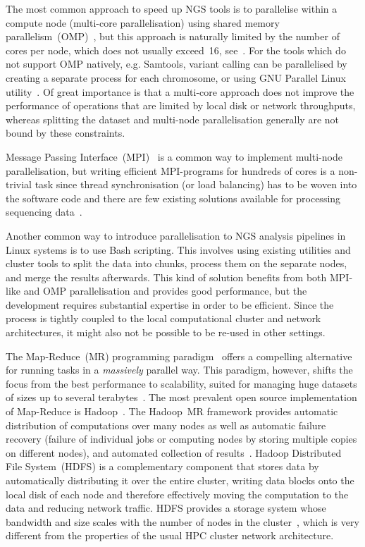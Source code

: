 \documentclass[10pt]{article}
\begin{document}
The most common approach to speed up NGS tools is to parallelise within a compute node (multi-core parallelisation) using shared memory parallelism~(OMP)~\cite{openmp}, but this approach is naturally limited by the number of cores per node, which does not usually exceed~16, see~\cite{top500}. For the tools which do not support OMP natively, e.g. Samtools, variant calling can be parallelised by creating a separate process  for  each chromosome, or using GNU Parallel Linux utility~\cite{Tange2011a}.
Of great importance is that a multi-core approach does not improve the performance of operations that are limited by local disk or network throughputs, whereas splitting the dataset and multi-node parallelisation generally are not bound by these constraints.

Message Passing Interface~(MPI)~\cite{mpi1} is a common way to implement multi-node parallelisation, but writing efficient MPI-programs for hundreds of cores is a non-trivial task since thread synchronisation (or load balancing) has to be woven into the software code and there are few existing solutions available for processing sequencing data~\cite{pmap, erne, gnumap}.

Another common way to introduce parallelisation to NGS analysis pipelines in Linux systems is to use Bash scripting. This involves using existing utilities and cluster tools to split the data into chunks, process them on the separate nodes, and merge the results afterwards. This kind of solution benefits from both MPI-like and OMP parallelisation and provides good performance, but the development requires substantial expertise in order to be efficient. Since the process is tightly coupled to the local computational cluster and network architectures, it might also not be possible to be re-used in other settings.

The Map-Reduce~(MR) programming paradigm~\cite{hadoop} offers a compelling alternative for running tasks in a {\it massively} parallel way. This paradigm, however, shifts the focus from the best performance to scalability, suited for managing huge datasets of sizes up to several terabytes~\cite{lin2010}.
The most prevalent open source implementation of Map-Reduce is Hadoop~\cite{hadoop,Hadoop:Guide}.
The Hadoop~MR framework provides automatic distribution of computations over many nodes as well as automatic failure recovery (failure of individual jobs or computing nodes by storing multiple copies on different nodes), and automated collection of results~\cite{Hadoop:Guide}. Hadoop Distributed File System~(HDFS) is a complementary component that stores data by automatically distributing it over the entire cluster, writing data blocks onto the local disk of each node and therefore effectively moving the computation to the data and reducing network traffic. HDFS provides a storage system whose bandwidth and size scales with the number of nodes in the cluster~\cite{Sammer:2012}, which is very different from the properties of the usual HPC cluster network architecture. 
\end{document}
